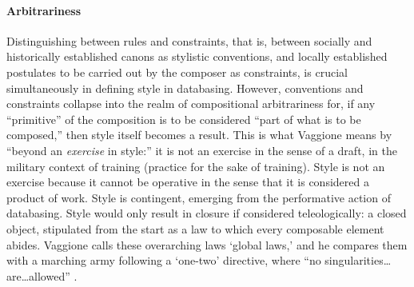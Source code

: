 \paragraph{Arbitrariness}
Distinguishing between rules and constraints, that is, between socially and historically established canons as stylistic conventions, and locally established postulates to be carried out by the composer as constraints, is crucial simultaneously in defining style in databasing. However, conventions and constraints collapse into the realm of compositional arbitrariness for, if any ``primitive'' of the composition is to be considered ``part of what is to be composed,'' then style itself becomes a result. This is what Vaggione means by ``beyond an \textit{exercise} in style:'' it is not an exercise in the sense of a draft, in the military context of training (practice for the sake of training). Style is not an exercise because it cannot be operative in the sense that it is considered a product of work. Style is contingent, emerging from the performative action of databasing. Style would only result in closure if considered teleologically: a closed object, stipulated from the start as a law to which every composable element abides. Vaggione calls these overarching laws `global laws,' and he compares them with a marching army following a `one-two' directive, where ``no singularities\dots are\dots allowed'' \parencite[101]{Vag93:Det}.



